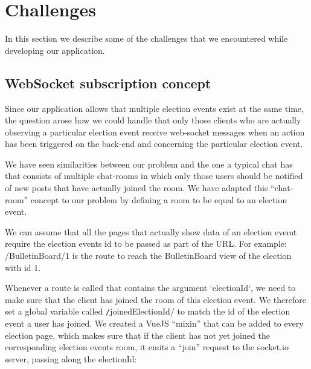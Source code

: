 \section{Challenges}
In this section we describe some of the challenges that we encountered while developing our application.

\subsection{WebSocket subscription concept}
Since our application allows that multiple election events exist at the same time, the question arose how we could handle that only those clients who are actually observing a particular election event receive web-socket messages when an action has been triggered on the back-end and concerning the particular election event.

We have seen similarities between our problem and the one a typical chat has that consists of multiple chat-rooms in which only those users should be notified of new posts that have actually joined the room. We have adapted this "`chat-room"' concept to our problem by defining a room to be equal to an election event.

We can assume that all the pages that actually show data of an election evemt require the election events id to be passed as part of the URL. For example: /BulletinBoard/1 is the route to reach the BulletinBoard view of the election with id 1.

Whenever a route is called that contains the argument `electionId`, we need to make sure that the client has joined the room of this election event. We therefore set a global variable called \texttt/joinedElectionId/ to match the id of the election event a user has joined. We created a VueJS "`mixin"' that can be added to every election page, which makes sure that if the client has not yet joined the corresponding election events room, it emits a "`join"' request to the socket.io server, passing along the electionId:

